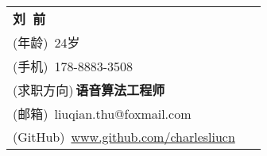 \newcommand{\myheader}{
\begin{tabular*}{\textwidth}{l@{\extracolsep{\fill}}r}
  \textbf{\huge 刘~前} & ~ \\
  {\color{labelgrey}(年龄)}$\,$ 24岁 & ~ \\
  {\color{labelgrey}(手机)}$\,$ 178-8883-3508 & ~ \\
  {\color{labelgrey}(求职方向)}$\,$\textbf{语音算法工程师} & ~ \\
  {\color{labelgrey}(邮箱)}$\,$ liuqian.thu@foxmail.com & ~ \\ 
  {\color{labelgrey}(GitHub)}$\,$ \href{http://www.github.com/charlesliucn}{www.github.com/charlesliucn} & ~
  \end{tabular*}
  \vspace{-4pt}
  }
\myheader
